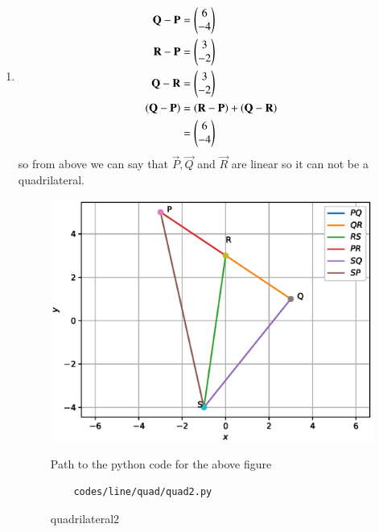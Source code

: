 \begin{enumerate}[label=\arabic*.,ref=\thesubsection.\theenumi]
\item 
\begin{align}
\mathbf{Q} - \mathbf{P} &= \begin{pmatrix}6\\-4\end{pmatrix}
\\
\mathbf{R} - \mathbf{P} &= \begin{pmatrix}3\\-2\end{pmatrix}
\\
\mathbf{Q} - \mathbf{R} &= \begin{pmatrix}3\\-2\end{pmatrix}
\\
\left(\mathbf{Q} - \mathbf{P}\right) &= \left(\mathbf{R} - \mathbf{P}\right) + \left(\mathbf{Q} - \mathbf{R}\right) 
\\&= \begin{pmatrix}6\\-4\end{pmatrix}
\end{align}
so from above we can say that $\vec P,\vec Q$ and $\vec R$ are linear so it can not be a quadrilateral.

\begin{figure}[!ht]
	\centering
	\includegraphics[width=\columnwidth]{./figures/line/quads/quad2.eps}
	\caption{quadrilateral2 }
	\label{fig:quadrilateral2}
	Path to the python code for the above figure
	\begin{lstlisting}
	codes/line/quad/quad2.py
	\end{lstlisting}
\end{figure}


\end{enumerate}
